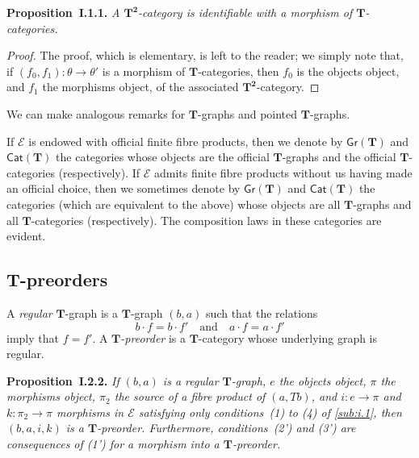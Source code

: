 \documentclass{article}
\newenvironment{itenv}[1]
  {\phantomsection\par\medskip\noindent\textbf{#1.}\itshape}
  {\par\medskip}
\newcommand{\oldpage}[1]{\marginpar{\footnotesize$\Big\vert$ \textit{p.~#1}}}
\newcommand{\TT}{\mathbf{T}}
\newcommand{\textand}{\quad\text{and}\quad}
\newcommand{\cat}[1]{\mathcal{#1}}
\newcommand{\Cat}[1]{\mathsf{#1}}
\newcommand{\Gr}[1]{\Cat{Gr}(#1)}
\begin{document}
\begin{itenv}{Proposition~I.1.1}
  A $\TT^\mathbf{2}$-category is identifiable with a morphism of $\TT$-categories.
\end{itenv}

\begin{proof}
  The proof, which is elementary, is left to the reader;
  we simply note that, if $(f_0,f_1)\colon\theta\to\theta'$ is a morphism of $\TT$-categories, then $f_0$ is the objects object, and $f_1$ the morphisms object, of the associated $\TT^\mathbf{2}$-category.
\end{proof}

We can make analogous remarks for $\TT$-graphs and pointed $\TT$-graphs.

\oldpage{229}
If $\cat{E}$ is endowed with official finite fibre products, then we denote by $\Gr{\TT}$ and $\Cat{Cat}(\TT)$ the categories whose objects are the official $\TT$-graphs and the official $\TT$-categories (respectively).
If $\cat{E}$ admits finite fibre products without us having made an official choice, then we sometimes denote by $\Gr{\TT}$ and $\Cat{Cat}(\TT)$ the categories (which are equivalent to the above) whose objects are all $\TT$-graphs and all $\TT$-categories (respectively).
The composition laws in these categories are evident.


\subsection{$\TT$-preorders}
\label{sub:i.2}

A \emph{regular} $\TT$-graph is a $\TT$-graph $(b,a)$ such that the relations
\[
  b\cdot f = b\cdot f'
  \textand
  a\cdot f = a\cdot f'
\]
imply that $f=f'$.
A \emph{$\TT$-preorder} is a $\TT$-category whose underlying graph is regular.

\begin{itenv}{Proposition~I.2.2}
  If $(b,a)$ is a regular $\TT$-graph, $e$ the objects object, $\pi$ the morphisms object, $\pi_2$ the source of a fibre product of $(a,Tb)$, and $i\colon e\to\pi$ and $k\colon\pi_2\to\pi$ morphisms in $\cat{E}$ satisfying only conditions~(1) to (4) of \cref{sub:i.1}, then $(b,a,i,k)$ is a $\TT$-preorder.
  Furthermore, conditions~(2') and (3') are consequences of (1') for a morphism into a $\TT$-preorder.
\end{itenv}
\end{document}
